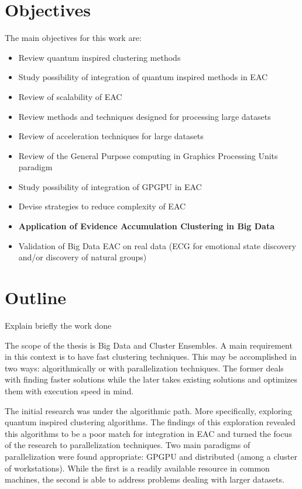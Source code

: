 \section{Objectives}
The main objectives for this work are:
\begin{itemize}

\item Review quantum inspired clustering methods

\item Study possibility of integration of quantum inspired methods in EAC

\item Review of scalability of EAC

\item Review methods and techniques designed for processing large datasets

\item Review of acceleration techniques for large datasets

\item Review of the General Purpose computing in Graphics Processing Units paradigm

\item Study possibility of integration of GPGPU in EAC

\item Devise strategies to reduce complexity of EAC

\item \textbf{Application of Evidence Accumulation Clustering in Big Data}

\item Validation of Big Data EAC on real data (ECG for emotional state discovery and/or discovery of natural groups)
\end{itemize}

\section{Outline}

Explain briefly the work done

The scope of the thesis is Big Data and Cluster Ensembles. A main requirement in this context is to have fast clustering techniques. This may be accomplished in two ways: algorithmically or with parallelization techniques. The former deals with finding faster solutions while the later takes existing solutions and optimizes them with execution speed in mind.

The initial research was under the algorithmic path. More specifically, exploring quantum inspired clustering algorithms. The findings of this exploration revealed this algorithms to be a poor match for integration in EAC and turned the focus of the research to parallelization techniques. Two main paradigms of parallelization were found appropriate: GPGPU and distributed (among a cluster of workstations). While the first is a readily available resource in common machines, the second is able to address problems dealing with larger datasets.

